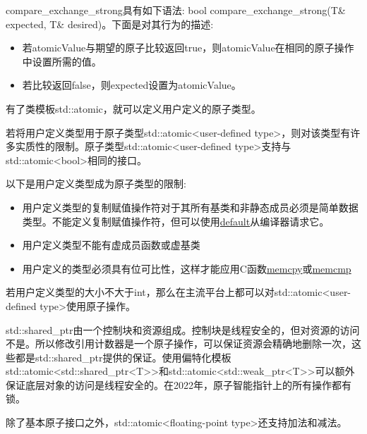 compare\_exchange\_strong具有如下语法: bool compare\_exchange\_strong(T\& expected, T\& desired)。下面是对其行为的描述:

\begin{itemize}
\item 
若atomicValue与期望的原子比较返回true，则atomicValue在相同的原子操作中设置所需的值。

\item 
若比较返回false，则expected设置为atomicValue。
\end{itemize}


有了类模板std::atomic，就可以定义用户定义的原子类型。

若将用户定义类型用于原子类型std::atomic<user-defined type>，则对该类型有许多实质性的限制。原子类型std::atomic<user-defined type>支持与std::atomic<bool>相同的接口。

以下是用户定义类型成为原子类型的限制:

\begin{itemize}
\item 
用户定义类型的复制赋值操作符对于其所有基类和非静态成员必须是简单数据类型。不能定义复制赋值操作符，但可以使用\href{http://en.cppreference.com/w/cpp/keyword/default}{default}从编译器请求它。

\item 
用户定义类型不能有虚成员函数或虚基类

\item 
用户定义的类型必须具有位可比性，这样才能应用C函数\href{http://en.cppreference.com/w/cpp/string/byte/memcpy}{memcpy}或\href{http://en.cppreference.com/w/cpp/string/byte/memcmp}{memcmp}
\end{itemize}

若用户定义类型的大小不大于int，那么在主流平台上都可以对std::atomic<user-defined type>使用原子操作。


std::shared\_ptr由一个控制块和资源组成。控制块是线程安全的，但对资源的访问不是。所以修改引用计数器是一个原子操作，可以保证资源会精确地删除一次，这些都是std::shared\_ptr提供的保证。使用偏特化模板std::atomic<std::shared\_ptr<T>{}>和std::atomic<std::weak\_ptr<T>{}>可以额外保证底层对象的访问是线程安全的。在2022年，原子智能指针上的所有操作都有锁。


除了基本原子接口之外，std::atomic<floating-point type>还支持加法和减法。

